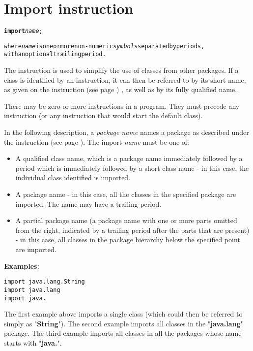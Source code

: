 \chapter{Import instruction}\label{refimport}
\begin{shaded}
\begin{alltt}
\textbf{import} \emph{name};

where \emph{name} is one or more non-numeric \emph{symbol}s separated by periods,\\ with an optional trailing period.
\end{alltt}
\end{shaded}
 
The  instruction is used to simplify the use of
classes from other packages.
If a class is identified by an  instruction, it can then
be referred to by its short name, as given on the
  instruction (see page \pageref{refclass}) , as well as by its fully
qualified name.
 
There may be zero or more  instructions in a program.
They must precede any  instruction (or any instruction
that would start the default class).
 
In the following description, a \emph{package name} names a package
as described under the   instruction (see page \pageref{refpackage}).
The import \emph{name} must be one of:
\begin{itemize}
\item A qualified class name, which is a package name immediately followed
by a period which is immediately followed by a short class name - in this case, the individual class identified is imported.
\item A package name - in this case, all the classes in the specified
package are imported.  The name may have a trailing period.
\item A partial package name (a package name with one or more parts
omitted from the right, indicated by a trailing period after the parts
that are present) - in this case, all classes in the package hierarchy
below the specified point are imported.
\end{itemize}
 \textbf{Examples:}
\begin{lstlisting}
import java.lang.String
import java.lang
import java.
\end{lstlisting}
The first example above imports a single class (which could then be
referred to simply as "\textbf{String}").
The second example imports all classes in the
"\textbf{java.lang}" package.
The third example imports all classes in all the packages whose name
starts with "\textbf{java.}".
 
